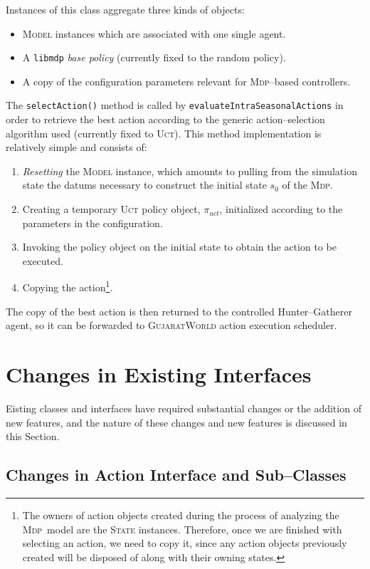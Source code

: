 \documentclass[a4paper,10pt]{article}
\newcommand{\mdp}{\textsc{Mdp}}
\begin{document}
Instances of this class aggregate three kinds of objects:
\begin{itemize}
\item \textsc{Model} instances which are associated with one single agent.
\item A \texttt{libmdp} \emph{base policy} (currently fixed to the random policy).
\item A copy of the configuration parameters relevant for \mdp--based controllers.
\end{itemize}
The \texttt{selectAction()} method is called by \texttt{evaluateIntraSeasonalActions} in order to retrieve
the best action according to the generic action--selection algorithm used (currently fixed to \textsc{Uct}). This method
implementation is relatively simple and consists of:
\begin{enumerate}
\item \emph{Resetting} the \textsc{Model} instance, which amounts to pulling from the simulation state the datums necessary
to construct the initial state $s_0$ of the \mdp.
\item Creating a temporary \textsc{Uct} policy object, $\pi_{uct}$, initialized according to the parameters in the configuration.
\item Invoking the policy object on the initial state to obtain the action to be executed.
\item Copying the action\footnote{The owners of action objects created during the process of analyzing the \mdp~model
are the \textsc{State} instances. Therefore, once we are finished with selecting an action, we need to copy it, since
any action objects previously created will be disposed of along with their owning states.}.
\end{enumerate}
The copy of the best action is then returned to the controlled Hunter--Gatherer agent, so it can be forwarded to 
\textsc{GujaratWorld} action execution scheduler.

\section{Changes in Existing Interfaces}

Eisting classes and interfaces have required substantial changes or the addition of new features, and the nature
of these changes and new features is discussed in this Section.

\subsection{Changes in Action Interface and Sub--Classes}
\label{changes_actions}
\end{document}
